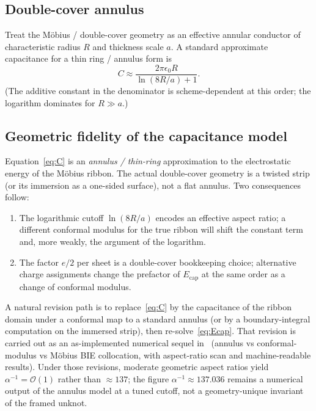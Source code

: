 \documentclass[11pt,a4paper]{article}
\begin{document}
\subsection{Double-cover annulus}

Treat the M\"obius / double-cover geometry as an effective annular
conductor of characteristic radius $R$ and thickness scale $a$.  A
standard approximate capacitance for a thin ring / annulus form is
\begin{equation}
\label{eq:C}
C \approx \frac{2\pi\epsilon_0 R}{\ln(8R/a) + 1}.
\end{equation}
(The additive constant in the denominator is scheme-dependent at this
order; the logarithm dominates for $R\gg a$.)

\subsection{Geometric fidelity of the capacitance model}
\label{sec:C-fidelity}

Equation~\eqref{eq:C} is an \emph{annulus / thin-ring} approximation to
the electrostatic energy of the M\"obius ribbon.  The actual
double-cover geometry is a twisted strip (or its immersion as a
one-sided surface), not a flat annulus.  Two consequences follow:

\begin{enumerate}[leftmargin=1.4em,itemsep=2pt]
  \item The logarithmic cutoff $\ln(8R/a)$ encodes an effective
        aspect ratio; a different conformal modulus for the true
        ribbon will shift the constant term and, more weakly, the
        argument of the logarithm.
  \item The factor $e/2$ per sheet is a double-cover bookkeeping
        choice; alternative charge assignments change the prefactor
        of $E_{\mathrm{cap}}$ at the same order as a change of
        conformal modulus.
\end{enumerate}

A natural revision path is to replace~\eqref{eq:C} by the capacitance
of the ribbon domain under a conformal map to a standard annulus (or
by a boundary-integral computation on the immersed strip), then
re-solve~\eqref{eq:Ecap}.  That revision is carried out as an
as-implemented numerical sequel in~\cite{ribboncap2026}
(annulus vs conformal-modulus vs M\"obius BIE collocation, with
aspect-ratio scan and machine-readable results).  Under those
revisions, moderate geometric aspect ratios yield
$\alpha^{-1}=\mathcal{O}(1)$ rather than $\approx 137$; the figure
$\alpha^{-1}\approx 137.036$ remains a numerical output of the
annulus model at a tuned cutoff, not a geometry-unique invariant of
the framed unknot.
\end{document}
